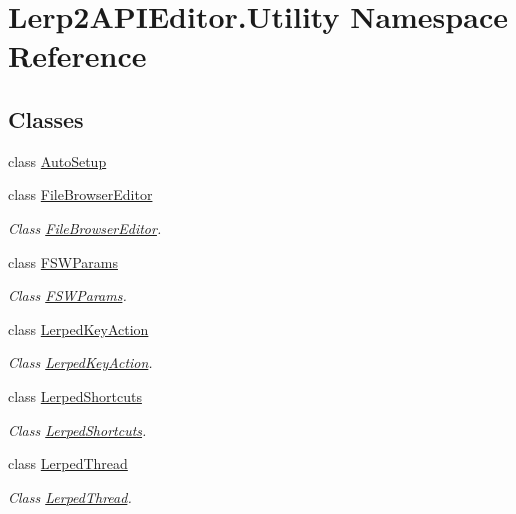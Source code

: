\hypertarget{namespace_lerp2_a_p_i_editor_1_1_utility}{}\section{Lerp2\+A\+P\+I\+Editor.\+Utility Namespace Reference}
\label{namespace_lerp2_a_p_i_editor_1_1_utility}
\subsection*{Classes}
\begin{DoxyCompactItemize}
\item 
class \hyperlink{class_lerp2_a_p_i_editor_1_1_utility_1_1_auto_setup}{Auto\+Setup}
\item 
class \hyperlink{class_lerp2_a_p_i_editor_1_1_utility_1_1_file_browser_editor}{File\+Browser\+Editor}
\begin{DoxyCompactList}\small\item\em Class \hyperlink{class_lerp2_a_p_i_editor_1_1_utility_1_1_file_browser_editor}{File\+Browser\+Editor}. \end{DoxyCompactList}\item 
class \hyperlink{class_lerp2_a_p_i_editor_1_1_utility_1_1_f_s_w_params}{F\+S\+W\+Params}
\begin{DoxyCompactList}\small\item\em Class \hyperlink{class_lerp2_a_p_i_editor_1_1_utility_1_1_f_s_w_params}{F\+S\+W\+Params}. \end{DoxyCompactList}\item 
class \hyperlink{class_lerp2_a_p_i_editor_1_1_utility_1_1_lerped_key_action}{Lerped\+Key\+Action}
\begin{DoxyCompactList}\small\item\em Class \hyperlink{class_lerp2_a_p_i_editor_1_1_utility_1_1_lerped_key_action}{Lerped\+Key\+Action}. \end{DoxyCompactList}\item 
class \hyperlink{class_lerp2_a_p_i_editor_1_1_utility_1_1_lerped_shortcuts}{Lerped\+Shortcuts}
\begin{DoxyCompactList}\small\item\em Class \hyperlink{class_lerp2_a_p_i_editor_1_1_utility_1_1_lerped_shortcuts}{Lerped\+Shortcuts}. \end{DoxyCompactList}\item 
class \hyperlink{class_lerp2_a_p_i_editor_1_1_utility_1_1_lerped_thread}{Lerped\+Thread}
\begin{DoxyCompactList}\small\item\em Class \hyperlink{class_lerp2_a_p_i_editor_1_1_utility_1_1_lerped_thread}{Lerped\+Thread}. \end{DoxyCompactList}\end{DoxyCompactItemize}
